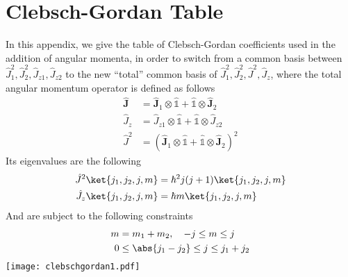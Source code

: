 \documentclass[a4paper, 11pt]{book}
\renewcommand{\vec}[1]{\mathbf{#1}}
\newcommand{\1}{\opr{\mathds{1}}}
\newcommand{\opr}[1]{\hat{#1}}
\newcommand{\vecopr}[1]{\opr{\vec{#1}}}
\theoremstyle{plain}
\begin{document}
	\chapter{Clebsch-Gordan Table}
	In this appendix, we give the table of Clebsch-Gordan coefficients used in the addition of angular momenta, in order to switch from a common basis between $\opr{J}^2_1,\opr{J}^2_2,\opr{J}_{z1},\opr{J}_{z2}$ to the new ``total'' common basis of $\opr{J}^2_1,\opr{J}^2_2,\opr{J}^2,\opr{J}_z$, where the total angular momentum operator is defined as follows
	\begin{equation}
		\begin{aligned}
			\vecopr{J}&=\vecopr{J}_1\otimes\1+\1\otimes\vecopr{J}_2\\
			\opr{J}_z&=\opr{J}_{z1}\otimes\1+\1\otimes\opr{J}_{z2}\\
			\opr{J}^2&=\left( \vecopr{J}_1\otimes\1+\1\otimes\vecopr{J}_2 \right)^2
		\end{aligned}
		\label{eq:cgcoeffputt}
	\end{equation}
	Its eigenvalues are the following
	\begin{equation}
		\begin{aligned}
			\opr{J}^2\ket{j_1,j_2,j,m}&=\hbar^2j(j+1)\ket{j_1,j_2,j,m}\\
			\opr{J}_z\ket{j_1,j_2,j,m}&=\hbar m\ket{j_1,j_2,j,m}
		\end{aligned}
		\label{eq:jsqeigenvalputt}
	\end{equation}
	And are subject to the following constraints
	\begin{equation}
		\begin{aligned}
			m&=m_1+m_2,\quad-j\le m\le j\\
			0&\le\abs{j_1-j_2}\le j\le j_1+j_2
		\end{aligned}
		\label{eq:eigenvaltotangmom}
	\end{equation}
	\newpage
	\texttt{[image: clebschgordan1.pdf]}
\end{document}
